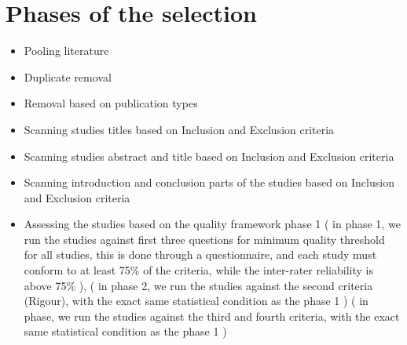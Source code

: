 \documentclass{article}
\theoremstyle{mytheoremstyle}
\theoremstyle{mytheoremstyle}
\theoremstyle{myproblemstyle}
\begin{document}
      \section{Phases of the selection}

      \begin{itemize}
        \item Pooling literature
        \item Duplicate removal 
        \item Removal based on publication types
        \item Scanning studies titles based on Inclusion and Exclusion criteria 
        \item Scanning studies abstract and title based on Inclusion and Exclusion criteria
        \item Scanning introduction and conclusion parts of the studies based on Inclusion and Exclusion criteria
        \item Assessing the studies based on the quality framework phase 1 ( in phase 1, we run the studies against first three questions for minimum quality threshold for all studies, this is done through a questionnaire, and each study must conform to at least 75\% of the criteria, while the inter-rater reliability is above 75\% ), ( in phase 2, we run the studies against the second criteria (Rigour), with the exact same statistical condition as the phase 1 ) ( in phase, we run the studies against the third and fourth criteria, with the exact same statistical condition as the phase 1 )
      \end{itemize}
\end{document}
